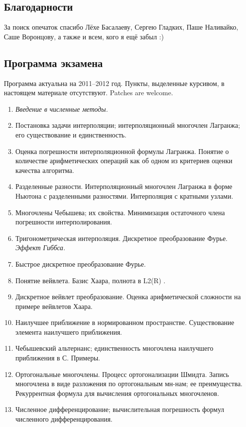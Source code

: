 \documentclass[a4paper]{article}
\begin{document}
\subsection*{Благодарности}

За поиск опечаток спасибо Лёхе Басалаеву, Сергею Гладких, Паше
Наливайко, Саше Воронцову, а также и всем, кого я ещё забыл :)
\subsection*{Программа экзамена}
Программа актуальна на 2011--2012 год. Пункты, выделенные курсивом,
в настоящем материале отсутствуют. Patches are welcome.
\begin{enumerate}
\item {\it Введение в численные методы.}
\item Постановка задачи интерполяции; интерполяционный многочлен
  Лагранжа; его существование и единственность.
\item Оценка погрешности интерполяционной формулы Лагранжа. Понятие
  о количестве арифметических операций как об одном из критериев
  оценки качества алгоритма.
\item Разделенные разности. Интерполяционный многочлен Лагранжа в
  форме Ньютона с разделенными разностями. Интерполяция с кратными
  узлами.
\item Многочлены Чебышева; их свойства. Минимизация остаточного члена
  погрешности интерполирования.
\item Тригонометрическая интерполяция. Дискретное преобразование
  Фурье.  {\it Эффект Гиббса.}
\item Быстрое дискретное преобразование Фурье.
\item Понятие вейвлета. Базис Хаара, полнота в L2(R) .
\item Дискретное вейвлет преобразование. Оценка арифметической
  сложности на примере вейвлетов Хаара.
\item Наилучшее приближение в нормированном
  пространстве. Существование элемента наилучшего приближения.
\item Чебышевский альтернанс; единственность многочлена наилучшего
  приближения в С. Примеры.
\item Ортогональные многочлены. Процесс ортогонализации
  Шмидта. Запись многочлена в виде разложения по ортогональным
  мн-нам; ее преимущества. Рекуррентная формула для вычисления
  ортогональных многочленов.
\item Численное дифференцирование; вычислительная погрешность формул
  численного дифференцирования.

\end{enumerate}
\end{document}
